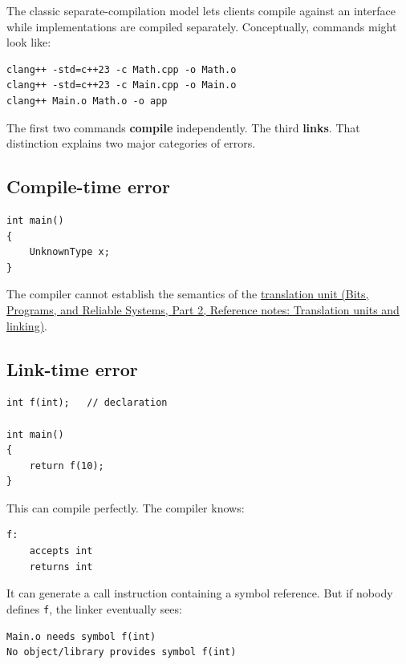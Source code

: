 The classic separate-compilation model lets clients compile against an interface while implementations are compiled separately. Conceptually, commands might look like:

\begin{verbatim}
clang++ -std=c++23 -c Math.cpp -o Math.o
clang++ -std=c++23 -c Main.cpp -o Main.o
clang++ Main.o Math.o -o app
\end{verbatim}

The first two commands \textbf{compile} independently. The third \textbf{links}. That distinction explains two major categories of errors.

\subsection{Compile-time error}\label{05-engine-i-ch002-compile-time-error}

\hypertarget{05-engine-i-ch002-compile-time-error}{}

\begin{verbatim}
int main()
{
    UnknownType x;
}
\end{verbatim}

The compiler cannot establish the semantics of the \href{../01-Bits-Programs-and-Reliable-Systems-P02/main.pdf\#nameddest=appendix-806686359e1b}{translation unit (Bits, Programs, and Reliable Systems, Part 2, Reference notes: Translation units and linking)}.

\subsection{Link-time error}\label{05-engine-i-ch002-link-time-error}

\hypertarget{05-engine-i-ch002-link-time-error}{}

\begin{verbatim}
int f(int);   // declaration

int main()
{
    return f(10);
}
\end{verbatim}

This can compile perfectly. The compiler knows:

\begin{verbatim}
f:
    accepts int
    returns int
\end{verbatim}

It can generate a call instruction containing a symbol reference. But if nobody defines \texttt{f}, the linker eventually sees:

\begin{verbatim}
Main.o needs symbol f(int)
No object/library provides symbol f(int)
\end{verbatim}

